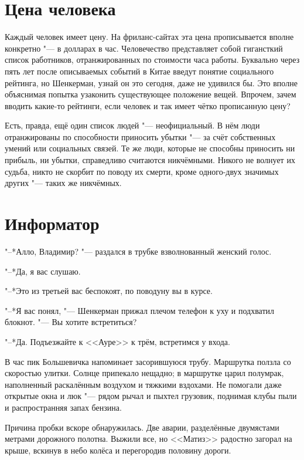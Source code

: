 \section{Цена человека}

Каждый человек имеет цену.
На фриланс-сайтах эта цена прописывается вполне конкретно "--- в долларах в час.
Человечество представляет собой гигансткий список работников, отранжированных по стоимости часа работы.
Буквально через пять лет после описываемых событий в Китае введут понятие социального рейтинга, но Шенкерман, узнай он это сегодня, даже не удивился бы.
Это вполне объяснимая попытка узаконить существующее положение вещей.
Впрочем, зачем вводить какие-то рейтинги, если человек и так имеет чётко прописанную цену?

Есть, правда, ещё один список людей "--- неофициальный.
В нём люди отранжированы по способности приносить убытки "--- за счёт собственных умений или социальных связей.
Те же люди, которые не способны приносить ни прибыль, ни убытки, справедливо считаются никчёмными.
Никого не волнует их судьба, никто не скорбит по поводу их смерти, кроме одного-двух значимых других "--- таких же никчёмных.

\section{Информатор}

"--*Алло, Владимир? "--- раздался в трубке взволнованный женский голос.

"--*Да, я вас слушаю.

"--*Это из третьей вас беспокоят, по поводу\ldotst ну вы в курсе.

"--*Я вас понял, "--- Шенкерман прижал плечом телефон к уху и подхватил блокнот.
"--- Вы хотите встретиться?

"--*Да.
Подъезжайте к <<Ауре>> к трём, встретимся у входа.

\razd

В час пик Большевичка напоминает засорившуюся трубу.
Маршрутка ползла со скоростью улитки.
Солнце припекало нещадно;
в маршрутке царил полумрак, наполненный раскалённым воздухом и тяжкими вздохами.
Не помогали даже открытые окна и люк "--- рядом рычал и пыхтел грузовик, поднимая клубы пыли и распространняя запах бензина.

Причина пробки вскоре обнаружилась.
Две аварии, разделённые двумястами метрами дорожного полотна.
Выжили все, но <<Матиз>> радостно загорал на крыше, вскинув в небо колёса и перегородив половину дороги.

